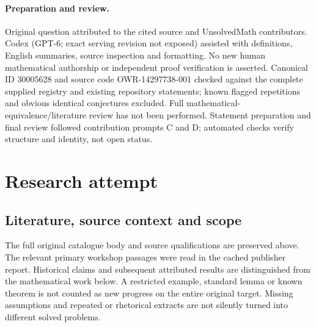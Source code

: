 \documentclass[11pt]{article}
\begin{document}
\paragraph{Preparation and review.}
Original question attributed to the cited source and UnsolvedMath contributors. Codex (GPT-6; exact serving revision not exposed) assisted with definitions, English summaries, source inspection and formatting. No new human mathematical authorship or independent proof verification is asserted. Canonical ID 30005628 and source code OWR-14297738-001 checked against the complete supplied registry and existing repository statements; known flagged repetitions and obvious identical conjectures excluded. Full mathematical-equivalence/literature review has not been performed. Statement preparation and final review followed contribution prompts C and D; automated checks verify structure and identity, not open status.
\label{end:30005628}

\section{Research attempt}
\subsection{Literature, source context and scope}
The full original catalogue body and source qualifications are preserved above. The relevant primary workshop passages were read in the cached publisher report. Historical claims and subsequent attributed results are distinguished from the mathematical work below. A restricted example, standard lemma or known theorem is not counted as new progress on the entire original target. Missing assumptions and repeated or rhetorical extracts are not silently turned into different solved problems.
\end{document}
